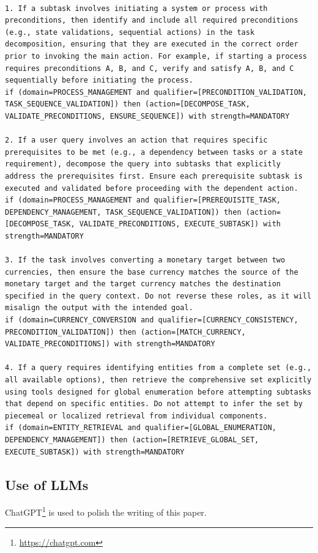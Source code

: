 \documentclass[11pt]{article}
\begin{document}
\begin{lstlisting}[style=rulestyle, caption={Sample rules learned from the BFCL: Multi-Turn-Base dataset}]

1. If a subtask involves initiating a system or process with preconditions, then identify and include all required preconditions (e.g., state validations, sequential actions) in the task decomposition, ensuring that they are executed in the correct order prior to invoking the main action. For example, if starting a process requires preconditions A, B, and C, verify and satisfy A, B, and C sequentially before initiating the process.
if (domain=PROCESS_MANAGEMENT and qualifier=[PRECONDITION_VALIDATION, TASK_SEQUENCE_VALIDATION]) then (action=[DECOMPOSE_TASK, VALIDATE_PRECONDITIONS, ENSURE_SEQUENCE]) with strength=MANDATORY

2. If a user query involves an action that requires specific prerequisites to be met (e.g., a dependency between tasks or a state requirement), decompose the query into subtasks that explicitly address the prerequisites first. Ensure each prerequisite subtask is executed and validated before proceeding with the dependent action.
if (domain=PROCESS_MANAGEMENT and qualifier=[PREREQUISITE_TASK, DEPENDENCY_MANAGEMENT, TASK_SEQUENCE_VALIDATION]) then (action=[DECOMPOSE_TASK, VALIDATE_PRECONDITIONS, EXECUTE_SUBTASK]) with strength=MANDATORY

3. If the task involves converting a monetary target between two currencies, then ensure the base currency matches the source of the monetary target and the target currency matches the destination specified in the query context. Do not reverse these roles, as it will misalign the output with the intended goal.
if (domain=CURRENCY_CONVERSION and qualifier=[CURRENCY_CONSISTENCY, PRECONDITION_VALIDATION]) then (action=[MATCH_CURRENCY, VALIDATE_PRECONDITIONS]) with strength=MANDATORY

4. If a query requires identifying entities from a complete set (e.g., all available options), then retrieve the comprehensive set explicitly using tools designed for global enumeration before attempting subtasks that depend on specific entities. Do not attempt to infer the set by piecemeal or localized retrieval from individual components.
if (domain=ENTITY_RETRIEVAL and qualifier=[GLOBAL_ENUMERATION, DEPENDENCY_MANAGEMENT]) then (action=[RETRIEVE_GLOBAL_SET, EXECUTE_SUBTASK]) with strength=MANDATORY

\end{lstlisting}




\subsection{Use of LLMs}

ChatGPT\footnote{\url{https://chatgpt.com}} is used to polish the writing of this paper.
\end{document}

